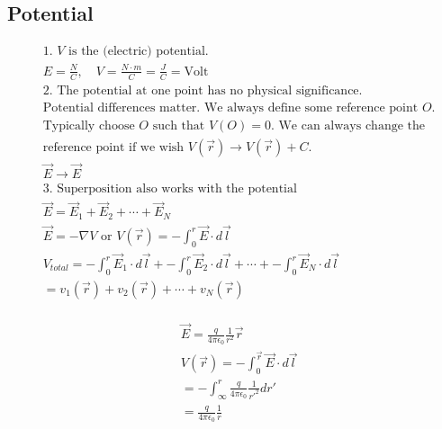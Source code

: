 \documentclass{article}
\begin{document}
\subsection{Potential}
\begin{center}
\begin{align*}
    &\text{1. $V$ is the (electric) potential.} \\
    &E = \frac{N}{C}, \quad V = \frac{N \cdot m}{C} = \frac{J}{C} = \text{Volt} \\
    &\text{2. The potential at one point has no physical significance.} \\
    &\text{Potential differences matter. We always define some reference point $O$.} \\
    &\text{Typically choose $O$ such that $V(O)=0$. We can always change the} \\
    &\text{reference point if we wish $V(\vec{r})\rightarrow V(\vec{r})+C$.} \\
    &\vec{E}\rightarrow\vec{E} \\
    &\text{3. Superposition also works with the potential} \\
    &\vec{E}=\vec{E}_1+\vec{E}_2+\cdots+\vec{E}_N \\
    &\vec{E}=-\nabla V \text{ or } V(\vec{r})=-\int_0^r \vec{E} \cdot d\vec{l} \\
    &V_{total}=-\int_0^r \vec{E}_1 \cdot d\vec{l} + -\int_0^r \vec{E}_2 \cdot d\vec{l} + \cdots + -\int_0^r \vec{E}_N \cdot d\vec{l} \\
    &= v_1(\vec{r}) + v_2(\vec{r}) + \cdots + v_N(\vec{r}) \\
\end{align*}
\end{center}

\begin{center}
\begin{minipage}{0.45\textwidth}
    \begin{center}
    \end{center}
\end{minipage}
\hfill
\begin{minipage}{0.45\textwidth}
    \begin{align*}
        &\vec{E}=\frac{q}{4\pi\epsilon_0}\frac{1}{r^2}\vec{r} \\
        &V(\vec{r})=-\int_0^{\vec{r}} \vec{E} \cdot d\vec{l} \\
        &=-\int_{\infty}^r \frac{q}{4\pi\epsilon_0}\frac{1}{r'^2} dr' \\
        &=\frac{q}{4\pi\epsilon_0}\frac{1}{r}
    \end{align*}
\end{minipage}
\end{center}
\end{document}
